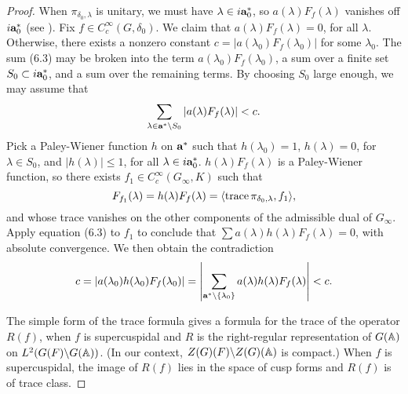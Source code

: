 \documentclass{amsart}
\newcommand\tr{\text{trace\,}}
\newcommand\bfa{\text{\bf a}}
\begin{document}
\begin{proof}
When $\pi_{\delta_0,\lambda}$ is unitary, we must have
$\lambda\in i\bfa_0^*$, so $a(\lambda)F_f(\lambda)$ vanishes off
$i\bfa_0^*$ (see \cite{Kn,16.6}).
Fix $f\in C_c^\infty(G,\delta_0)$.
We claim that $a(\lambda) F_f(\lambda) = 0$, for all $\lambda$.
Otherwise, there exists a nonzero constant $c = |a(\lambda_0)F_f(\lambda_0)|$ for some
$\lambda_0$.  The sum (6.3)
may be broken into the term $a(\lambda_0)F_f(\lambda_0)$,
a sum over a finite set $S_0\subset i\bfa_0^*$, and 
a sum over the remaining terms.  By choosing $S_0$ large enough,
we may assume that
$$\sum_{\lambda\in \bfa^*\setminus S_0} |a(\lambda)F_f(\lambda)|< {c}.$$
Pick a Paley-Wiener function $h$ on $\bfa^*$
such that $h(\lambda_0)=1$,
$h(\lambda)=0$, for $\lambda\in S_0$, and $|h(\lambda)|\le1$,
for all $\lambda\in i\bfa_0^*$.  
$h(\lambda)F_f(\lambda)$ is a Paley-Wiener function,
so there exists $f_1\in C_c^\infty(G_\infty,K)$ such that
$$F_{f_1}(\lambda)=
	h(\lambda)F_f(\lambda) 
	= \langle\tr \pi_{\delta_0,\lambda},f_1\rangle,$$
and whose trace vanishes on the other components of the admissible
dual of $G_\infty$.  
Apply equation (6.3) to $f_1$ to conclude that
$\sum a(\lambda)h(\lambda)F_f(\lambda)=0$,
with absolute convergence.  We then obtain the contradiction
$$ c = |a(\lambda_0)h(\lambda_0)F_f(\lambda_0)|
	= \left|\sum_{\bfa^*\setminus\{\lambda_0\}} 
	a(\lambda)h(\lambda)F_f(\lambda)\right| < c.$$


\bigskip
	
The simple form of the
trace formula gives a formula for the trace of the operator $R(f)$,
when $f$ is supercuspidal and $R$ is the right-regular representation
of $G(\Bbb A)$ on $L^2(G(F)\backslash G(\Bbb A))$.  (In our context,
$Z(G)(F)\backslash Z(G)(\Bbb A)$ is compact.) %
When $f$ is supercuspidal, the image of $R(f)$ lies in the space
of cusp forms and $R(f)$ is of trace class.  


\end{proof}
\end{document}
